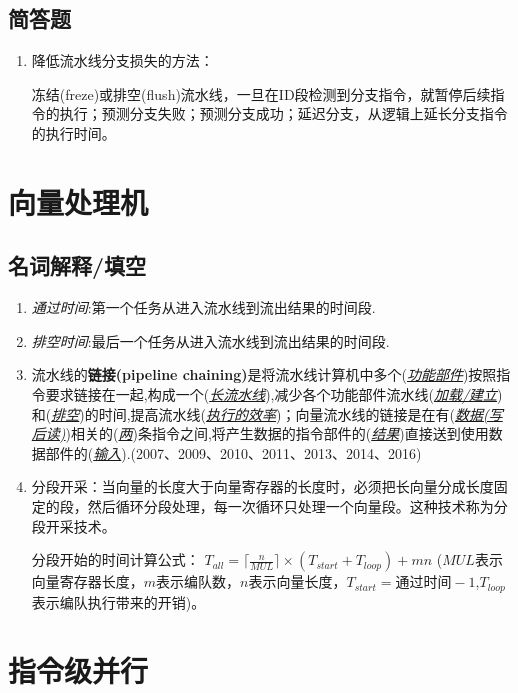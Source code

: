 \documentclass[a4paper]{ctexbook}
\newcommand{\blank}[1]{(\emph{\underline{#1}})}
\begin{document}
\section{简答题}
\begin{enumerate}
  \item 降低流水线分支损失的方法：
  
  冻结(freze)或排空(flush)流水线，一旦在ID段检测到分支指令，就暂停后续指令的执行；预测分支失败；预测分支成功；延迟分支，从逻辑上延长分支指令的执行时间。
\end{enumerate}


\newpage
\chapter{向量处理机}
\section{名词解释/填空}
\begin{enumerate}
  \item \emph{通过时间}:第一个任务从进入流水线到流出结果的时间段.
  \item \emph{排空时间}:最后一个任务从进入流水线到流出结果的时间段.
  \item 流水线的\textbf{链接(pipeline chaining)}是将流水线计算机中多个(\emph{\underline{功能部件}})按照指令要求链接在一起,构成一个\blank{长流水线},减少各个功能部件流水线(\emph{\underline{加载/建立}})和\blank{排空}的时间,提高流水线\blank{执行的效率}；向量流水线的链接是在有\blank{数据(写后读)}相关的\blank{两}条指令之间,将产生数据的指令部件的\blank{结果}直接送到使用数据部件的\blank{输入}.(2007、2009、2010、2011、2013、2014、2016)
  \item 分段开采：当向量的长度大于向量寄存器的长度时，必须把长向量分成长度固定的段，然后循环分段处理，每一次循环只处理一个向量段。这种技术称为分段开采技术。
  
  分段开始的时间计算公式： $T_{all}=\lceil\frac{n}{MUL}\rceil\times(T_{start}+T_{loop})+mn$  ($MUL$表示向量寄存器长度，$m$表示编队数，$n$表示向量长度，$T_{start}=\text{通过时间}-1$,$T_{loop}$表示编队执行带来的开销)。     
\end{enumerate}
\newpage
\chapter{指令级并行}
\end{document}
